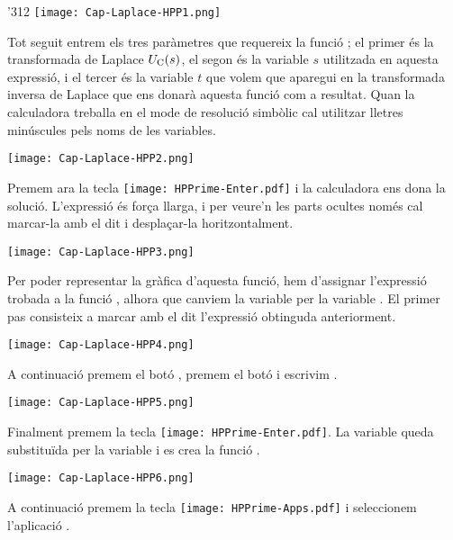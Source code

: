 \begin{exemple}
\begin{dingautolist}{'312}
            \texttt{[image: Cap-Laplace-HPP1.png]}

         \item Tot seguit entrem els tres paràmetres que requereix la funció ; el primer és la transformada de Laplace  $U_\mathrm{C}(s)$, el segon és la variable $s$ utilitzada en aquesta expressió, i el tercer és la variable $t$ que volem que aparegui en la transformada inversa de Laplace que ens donarà aquesta funció com a resultat. Quan la calculadora treballa en el  mode de resolució simbòlic cal utilitzar lletres minúscules pels noms de les variables.

            \texttt{[image: Cap-Laplace-HPP2.png]}\vspace{5mm}

         \item Premem ara la tecla \texttt{[image: HPPrime-Enter.pdf]} i la calculadora ens dona la solució. L'expressió és força llarga, i per veure'n les parts ocultes només cal marcar-la amb el dit i desplaçar-la horitzontalment.

            \texttt{[image: Cap-Laplace-HPP3.png]}\vspace{5mm}

         \item Per  poder representar la gràfica d'aquesta funció, hem d'assignar l'expressió trobada a la  funció , alhora que canviem la variable  per la variable . El primer pas consisteix a marcar amb el dit l'expressió obtinguda anteriorment.

            \texttt{[image: Cap-Laplace-HPP4.png]}\vspace{5mm}

         \item A continuació premem el botó  , premem el botó  i  escrivim  .

             \texttt{[image: Cap-Laplace-HPP5.png]}\vspace{5mm}

         \item Finalment premem la tecla \texttt{[image: HPPrime-Enter.pdf]}. La variable  queda substituïda per la variable  i es crea la funció .

          \texttt{[image: Cap-Laplace-HPP6.png]}\vspace{5mm}


         \item A continuació premem  la tecla \texttt{[image: HPPrime-Apps.pdf]} i seleccionem  l'aplicació .


\end{dingautolist}
\end{exemple}
